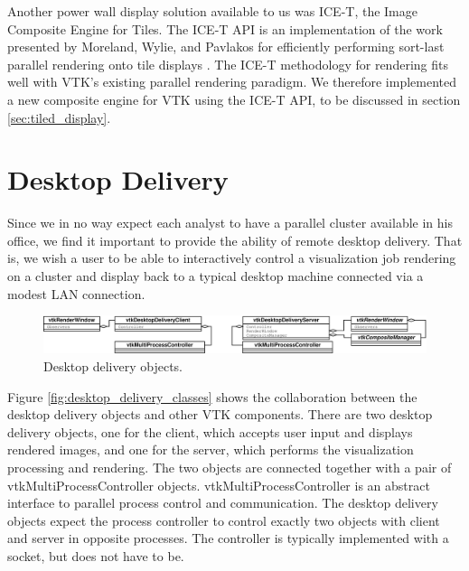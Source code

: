 \documentclass[twocolumn]{article}
\begin{document}
Another power wall display solution available to us was ICE-T, the Image
Composite Engine for Tiles.  The ICE-T API is an implementation of the work
presented by Moreland, Wylie, and Pavlakos for efficiently performing
sort-last parallel rendering onto tile displays \cite{Moreland01}.  The
ICE-T methodology for rendering fits well with VTK's existing parallel
rendering paradigm.  We therefore implemented a new composite engine for
VTK using the ICE-T API, to be discussed in section
\ref{sec:tiled_display}.


\section{Desktop Delivery}
\label{sec:desktop_delivery}

Since we in no way expect each analyst to have a parallel cluster available
in his office, we find it important to provide the ability of remote
desktop delivery.  That is, we wish a user to be able to interactively
control a visualization job rendering on a cluster and display back to a
typical desktop machine connected via a modest LAN connection.

\begin{figure}
  \begin{center}
    \includegraphics[scale=0.23]{images/DesktopDeliveryClasses}
  \end{center}
  \caption{Desktop delivery objects.}
  \label{fig:desktop_delivery_classes}
\end{figure}

Figure \vref{fig:desktop_delivery_classes} shows the collaboration between
the desktop delivery objects and other VTK components.  There are two
desktop delivery objects, one for the client, which accepts user input and
displays rendered images, and one for the server, which performs the
visualization processing and rendering.  The two objects are connected
together with a pair of vtkMultiProcessController objects.
vtkMultiProcessController is an abstract interface to parallel process
control and communication.  The desktop delivery objects expect the process
controller to control exactly two objects with client and server in
opposite processes.  The controller is typically implemented with a socket,
but does not have to be.
\end{document}
